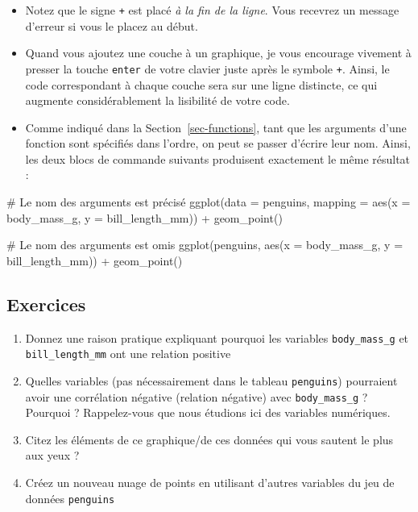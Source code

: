 \documentclass[
  a4paper,
  DIV=11,
  numbers=noendperiod,
  oneside]{scrreprt}
\newenvironment{Shaded}{}{}
\newcommand{\AttributeTok}[1]{\textcolor[rgb]{0.84,0.23,0.29}{#1}}
\newcommand{\CommentTok}[1]{\textcolor[rgb]{0.42,0.45,0.49}{#1}}
\newcommand{\FunctionTok}[1]{\textcolor[rgb]{0.44,0.26,0.76}{#1}}
\newcommand{\NormalTok}[1]{\textcolor[rgb]{0.14,0.16,0.18}{#1}}
\newcommand{\SpecialCharTok}[1]{\textcolor[rgb]{0.00,0.36,0.77}{#1}}
\providecommand{\tightlist}{%
  \setlength{\itemsep}{0pt}\setlength{\parskip}{0pt}}\usepackage{longtable,booktabs,array}
\begin{document}
\begin{itemize}
\tightlist
\item
  Notez que le signe \texttt{+} est placé \emph{à la fin de la ligne}.
  Vous recevrez un message d'erreur si vous le placez au début.
\item
  Quand vous ajoutez une couche à un graphique, je vous encourage
  vivement à presser la touche \texttt{enter} de votre clavier juste
  après le symbole \texttt{+}. Ainsi, le code correspondant à chaque
  couche sera sur une ligne distincte, ce qui augmente considérablement
  la lisibilité de votre code.
\item
  Comme indiqué dans la Section~\ref{sec-functions}, tant que les
  arguments d'une fonction sont spécifiés dans l'ordre, on peut se
  passer d'écrire leur nom. Ainsi, les deux blocs de commande suivants
  produisent exactement le même résultat :
\end{itemize}

\begin{Shaded}
\begin{Highlighting}[]
\CommentTok{\# Le nom des arguments est précisé}
\FunctionTok{ggplot}\NormalTok{(}\AttributeTok{data =}\NormalTok{ penguins, }\AttributeTok{mapping =} \FunctionTok{aes}\NormalTok{(}\AttributeTok{x =}\NormalTok{ body\_mass\_g, }\AttributeTok{y =}\NormalTok{ bill\_length\_mm)) }\SpecialCharTok{+}
  \FunctionTok{geom\_point}\NormalTok{()}

\CommentTok{\# Le nom des arguments est omis}
\FunctionTok{ggplot}\NormalTok{(penguins, }\FunctionTok{aes}\NormalTok{(}\AttributeTok{x =}\NormalTok{ body\_mass\_g, }\AttributeTok{y =}\NormalTok{ bill\_length\_mm)) }\SpecialCharTok{+}
  \FunctionTok{geom\_point}\NormalTok{()}
\end{Highlighting}
\end{Shaded}

\subsection{Exercices}\label{sec-exo-3}

\begin{enumerate}
\def\labelenumi{\arabic{enumi}.}
\tightlist
\item
  Donnez une raison pratique expliquant pourquoi les variables
  \texttt{body\_mass\_g} et \texttt{bill\_length\_mm} ont une relation
  positive
\item
  Quelles variables (pas nécessairement dans le tableau
  \texttt{penguins}) pourraient avoir une corrélation négative (relation
  négative) avec \texttt{body\_mass\_g} ? Pourquoi ? Rappelez-vous que
  nous étudions ici des variables numériques.
\item
  Citez les éléments de ce graphique/de ces données qui vous sautent le
  plus aux yeux ?
\item
  Créez un nouveau nuage de points en utilisant d'autres variables du
  jeu de données \texttt{penguins}
\end{enumerate}
\end{document}
